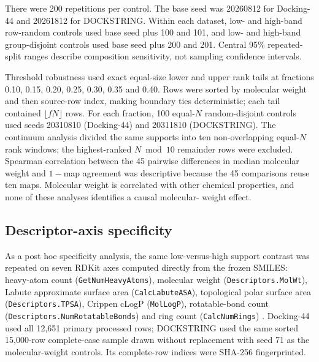 There were 200 repetitions per control.  The base seed was 20260812 for
Docking-44 and 20261812 for DOCKSTRING.  Within each dataset, low- and high-band
row-random controls used base seed plus 100 and 101, and low- and high-band
group-disjoint controls used base seed plus 200 and 201.  Central 95\% repeated-
split ranges describe composition sensitivity, not sampling confidence
intervals.

Threshold robustness used exact equal-size lower and upper rank tails at
fractions 0.10, 0.15, 0.20, 0.25, 0.30, 0.35 and 0.40.  Rows were sorted by
molecular weight and then source-row index, making boundary ties deterministic;
each tail contained $\lfloor fN\rfloor$ rows.  For each fraction, 100 equal-$N$
random-disjoint controls used seeds 20310810 (Docking-44) and 20311810
(DOCKSTRING).  The continuum analysis divided the same supports into ten
non-overlapping equal-$N$ rank windows; the highest-ranked $N\bmod 10$ remainder
rows were excluded.  Spearman correlation between the 45 pairwise differences
in median molecular weight and $1-$map agreement was descriptive because the
45 comparisons reuse ten maps.  Molecular weight is correlated with other
chemical properties, and none of these analyses identifies a causal molecular-
weight effect.

\subsection{Descriptor-axis specificity}

As a post hoc specificity analysis, the same low-versus-high support contrast
was repeated on seven RDKit axes computed directly from the frozen SMILES:
heavy-atom count (\texttt{GetNumHeavyAtoms}), molecular weight
(\texttt{Descriptors.MolWt}), Labute approximate surface area
(\texttt{CalcLabuteASA}), topological polar surface area
(\texttt{Descriptors.TPSA}), Crippen cLogP (\texttt{MolLogP}), rotatable-bond
count (\texttt{Descriptors.NumRotatableBonds}) and ring count
(\texttt{CalcNumRings}) \cite{rdkit2025}.  Docking-44 used all 12,651 primary
processed rows; DOCKSTRING used the same sorted 15,000-row complete-case sample
drawn without replacement with seed 71 as the molecular-weight controls.  Its
complete-row indices were SHA-256 fingerprinted.

